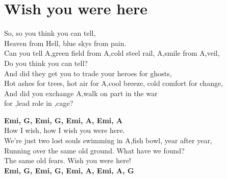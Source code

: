\section{Wish you were here}
\onehalfspacing

So, so you think you can tell,\\
Heaven from Hell, blue skys from pain.\\
Can you tell A,green field from A,cold steel rail, A,smile from A,veil,\\
Do you think you can tell?\\

And did they get you to trade your heroes for ghosts,\\
Hot ashes for trees, hot air for A,cool breeze, cold comfort for change, \\
And did you exchange A,walk on part in the war \\
for ,lead role in ,cage?\\

\singlespacing

\textbf{Emi, G, Emi, G, Emi, A, Emi, A}\\

How I wish, how I wish you were here.\\
We're just two lost souls swimming in A,fish bowl, year after year,\\
Running over the same old ground. What have we found?\\
The same old fears. Wish you were here!\\

\textbf{Emi, G, Emi, G, Emi, A, Emi, A, G}\\






